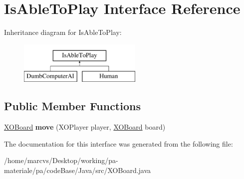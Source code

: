 \hypertarget{interfaceIsAbleToPlay}{
\section{IsAbleToPlay Interface Reference}
\label{interfaceIsAbleToPlay}
}
Inheritance diagram for IsAbleToPlay:\begin{figure}[H]
\begin{center}
\leavevmode
\includegraphics[height=2.000000cm]{interfaceIsAbleToPlay}
\end{center}
\end{figure}
\subsection*{Public Member Functions}
\begin{DoxyCompactItemize}
\item 
\hypertarget{interfaceIsAbleToPlay_ade65fcb1c3423d01bdd059e5ccd22a6d}{
\hyperlink{classXOBoard}{XOBoard} {\bfseries move} (XOPlayer player, \hyperlink{classXOBoard}{XOBoard} board)}
\label{interfaceIsAbleToPlay_ade65fcb1c3423d01bdd059e5ccd22a6d}

\end{DoxyCompactItemize}


The documentation for this interface was generated from the following file:\begin{DoxyCompactItemize}
\item 
/home/marcvs/Desktop/working/pa-\/materiale/pa/codeBase/Java/src/XOBoard.java\end{DoxyCompactItemize}
